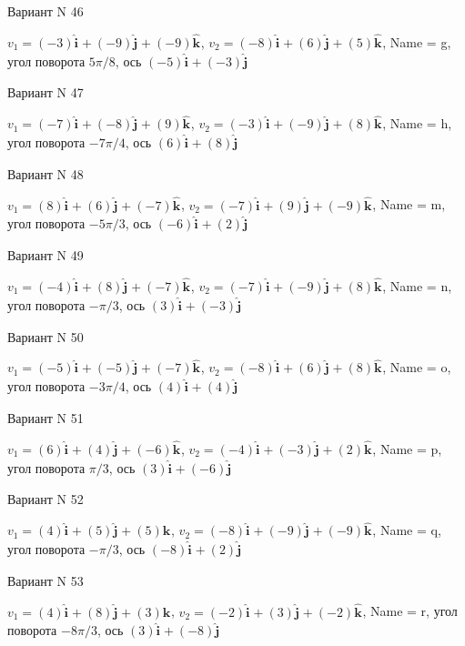 \documentclass[11pt]{report}
\begin{document}
Вариант N 46

$v_1 = (-3)\mathbf{\hat{i}_{}} + (-9)\mathbf{\hat{j}_{}} + (-9)\mathbf{\hat{k}_{}}$, $v_2 = (-8)\mathbf{\hat{i}_{}} + (6)\mathbf{\hat{j}_{}} + (5)\mathbf{\hat{k}_{}}$, Name = g, угол поворота $5 \pi / 8$, ось $(-5)\mathbf{\hat{i}_{}} + (-3)\mathbf{\hat{j}_{}}$

Вариант N 47

$v_1 = (-7)\mathbf{\hat{i}_{}} + (-8)\mathbf{\hat{j}_{}} + (9)\mathbf{\hat{k}_{}}$, $v_2 = (-3)\mathbf{\hat{i}_{}} + (-9)\mathbf{\hat{j}_{}} + (8)\mathbf{\hat{k}_{}}$, Name = h, угол поворота $- 7 \pi / 4$, ось $(6)\mathbf{\hat{i}_{}} + (8)\mathbf{\hat{j}_{}}$

Вариант N 48

$v_1 = (8)\mathbf{\hat{i}_{}} + (6)\mathbf{\hat{j}_{}} + (-7)\mathbf{\hat{k}_{}}$, $v_2 = (-7)\mathbf{\hat{i}_{}} + (9)\mathbf{\hat{j}_{}} + (-9)\mathbf{\hat{k}_{}}$, Name = m, угол поворота $- 5 \pi / 3$, ось $(-6)\mathbf{\hat{i}_{}} + (2)\mathbf{\hat{j}_{}}$

Вариант N 49

$v_1 = (-4)\mathbf{\hat{i}_{}} + (8)\mathbf{\hat{j}_{}} + (-7)\mathbf{\hat{k}_{}}$, $v_2 = (-7)\mathbf{\hat{i}_{}} + (-9)\mathbf{\hat{j}_{}} + (8)\mathbf{\hat{k}_{}}$, Name = n, угол поворота $- \pi / 3$, ось $(3)\mathbf{\hat{i}_{}} + (-3)\mathbf{\hat{j}_{}}$

Вариант N 50

$v_1 = (-5)\mathbf{\hat{i}_{}} + (-5)\mathbf{\hat{j}_{}} + (-7)\mathbf{\hat{k}_{}}$, $v_2 = (-8)\mathbf{\hat{i}_{}} + (6)\mathbf{\hat{j}_{}} + (8)\mathbf{\hat{k}_{}}$, Name = o, угол поворота $- 3 \pi / 4$, ось $(4)\mathbf{\hat{i}_{}} + (4)\mathbf{\hat{j}_{}}$

Вариант N 51

$v_1 = (6)\mathbf{\hat{i}_{}} + (4)\mathbf{\hat{j}_{}} + (-6)\mathbf{\hat{k}_{}}$, $v_2 = (-4)\mathbf{\hat{i}_{}} + (-3)\mathbf{\hat{j}_{}} + (2)\mathbf{\hat{k}_{}}$, Name = p, угол поворота $\pi / 3$, ось $(3)\mathbf{\hat{i}_{}} + (-6)\mathbf{\hat{j}_{}}$

Вариант N 52

$v_1 = (4)\mathbf{\hat{i}_{}} + (5)\mathbf{\hat{j}_{}} + (5)\mathbf{\hat{k}_{}}$, $v_2 = (-8)\mathbf{\hat{i}_{}} + (-9)\mathbf{\hat{j}_{}} + (-9)\mathbf{\hat{k}_{}}$, Name = q, угол поворота $- \pi / 3$, ось $(-8)\mathbf{\hat{i}_{}} + (2)\mathbf{\hat{j}_{}}$

Вариант N 53

$v_1 = (4)\mathbf{\hat{i}_{}} + (8)\mathbf{\hat{j}_{}} + (3)\mathbf{\hat{k}_{}}$, $v_2 = (-2)\mathbf{\hat{i}_{}} + (3)\mathbf{\hat{j}_{}} + (-2)\mathbf{\hat{k}_{}}$, Name = r, угол поворота $- 8 \pi / 3$, ось $(3)\mathbf{\hat{i}_{}} + (-8)\mathbf{\hat{j}_{}}$
\end{document}
